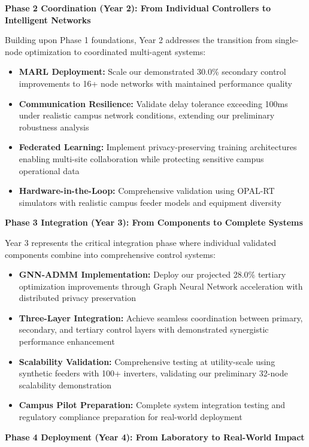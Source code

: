 \documentclass[12pt]{article}
\begin{document}
\textbf{Phase 2 Coordination (Year 2): From Individual Controllers to Intelligent Networks}

Building upon Phase 1 foundations, Year 2 addresses the transition from single-node optimization to coordinated multi-agent systems:

\begin{itemize}
\item \textbf{MARL Deployment:} Scale our demonstrated 30.0\% secondary control improvements to 16+ node networks with maintained performance quality
\item \textbf{Communication Resilience:} Validate delay tolerance exceeding 100ms under realistic campus network conditions, extending our preliminary robustness analysis
\item \textbf{Federated Learning:} Implement privacy-preserving training architectures enabling multi-site collaboration while protecting sensitive campus operational data  
\item \textbf{Hardware-in-the-Loop:} Comprehensive validation using OPAL-RT simulators with realistic campus feeder models and equipment diversity
\end{itemize}

\textbf{Phase 3 Integration (Year 3): From Components to Complete Systems}

Year 3 represents the critical integration phase where individual validated components combine into comprehensive control systems:

\begin{itemize}
\item \textbf{GNN-ADMM Implementation:} Deploy our projected 28.0\% tertiary optimization improvements through Graph Neural Network acceleration with distributed privacy preservation
\item \textbf{Three-Layer Integration:} Achieve seamless coordination between primary, secondary, and tertiary control layers with demonstrated synergistic performance enhancement
\item \textbf{Scalability Validation:} Comprehensive testing at utility-scale using synthetic feeders with 100+ inverters, validating our preliminary 32-node scalability demonstration
\item \textbf{Campus Pilot Preparation:} Complete system integration testing and regulatory compliance preparation for real-world deployment
\end{itemize}

\textbf{Phase 4 Deployment (Year 4): From Laboratory to Real-World Impact}
\end{document}

